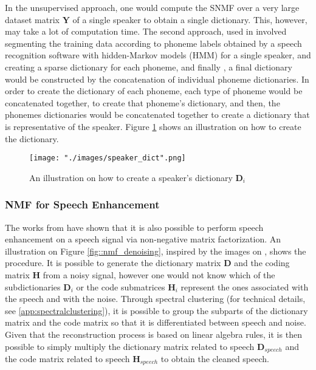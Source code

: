 In the unsupervised approach, one would compute the SNMF over a very large dataset matrix $\bm{Y}$ of a single speaker to obtain a single dictionary. This, however, may take a lot of computation time. The second approach, used in \cite{singlechannel} involved segmenting the training data according to phoneme labels obtained by a speech recognition software with hidden-Markov models (HMM) for a single speaker, and creating a sparse dictionary for each phoneme, and finally , a final dictionary would be constructed by the concatenation of individual phoneme dictionaries. In order to create the dictionary of each phoneme, each type of phoneme would be concatenated together, to create that phoneme's dictionary, and then, the phonemes dictionaries would be concatenated together to create a dictionary that is representative of the speaker. Figure \ref{fig::speaker_dict} shows an illustration on how to create the dictionary.

\begin{figure}[H]
\begin{center}
    \texttt{[image: "./images/speaker\_dict".png]}
    \caption{An illustration on how to create a speaker's dictionary $\bm{D}_i$}
    \label{fig::speaker_dict}
\end{center}
\end{figure}

\subsubsection{NMF for Speech Enhancement}
The works from \cite{nmf_denoising} have shown that it is also possible to perform speech enhancement on a speech signal via non-negative matrix factorization. An illustration on Figure \ref{fig::nmf_denoising}, inspired by the images on \cite{nmf_denoising}, shows the procedure. It is possible to generate the dictionary matrix $\bm{D}$ and the coding matrix $\bm{H}$ from a noisy signal, however one would not know which of the subdictionaries $\bm{D}_i$ or the code submatrices $\bm{H}_i$ represent the ones associated with the speech and with the noise. Through spectral clustering (for technical details, see \ref{app:spectralclustering}), it is possible to group the subparts of the dictionary matrix and the code matrix so that it is differentiated between speech and noise. Given that the reconstruction process is based on linear algebra rules, it is then possible to simply multiply the dictionary matrix related to speech $\bm{D}_{speech}$ and the code matrix related to speech $\bm{H}_{speech}$ to obtain the cleaned speech.

